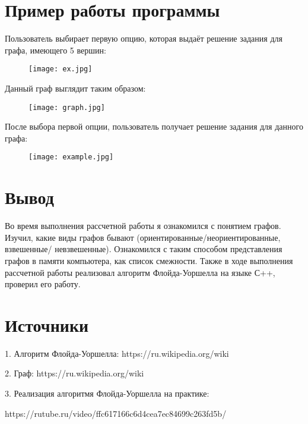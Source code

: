\documentclass[14 pt]{article}
\begin{document}
\section{Пример работы программы}
\begin{пример}
Пользователь выбирает первую опцию, которая выдаёт решение задания для графа, имеющего 5 вершин: 
\begin{figure}[H]
    \texttt{[image: ex.jpg]}
    \centering
    \end{figure}
\par
\newpage
Данный граф выглядит таким образом:
\begin{figure}[H]
    \texttt{[image: graph.jpg]}
    \centering
\end{figure}
\par
После выбора первой опции, пользователь получает решение задания для данного графа:
\begin{figure}[H]
    \texttt{[image: example.jpg]}
    \centering
\end{figure}
\end{пример}
\section{Вывод}
\begin{вывод}
Во время выполнения рассчетной работы я ознакомился с понятием графов. Изучил, какие виды графов бывают (ориентированные/неориентированные, взвешенные/ невзвешенные). Ознакомился с таким способом представления графов в памяти компьютера, как список смежности. Также в ходе выполнения рассчетной работы реализовал алгоритм Флойда-Уоршелла на языке С++, проверил его работу.
\end{вывод}
\section{Источники}
\begin{источники}
1. Алгоритм Флойда-Уоршелла: https://ru.wikipedia.org/wiki
\par
2. Граф: https://ru.wikipedia.org/wiki
\par
3. Реализация алгоритмя Флойда-Уоршелла на практике: \par
https://rutube.ru/video/ffc617166c6d4cea7ec84699c263fd5b/
\end{источники}
\end{document}
